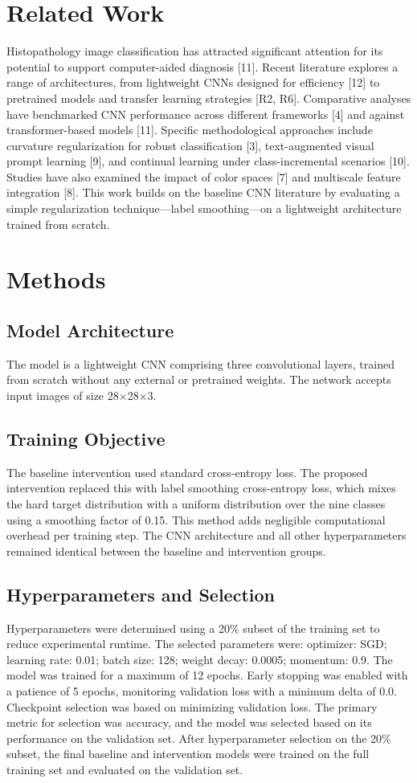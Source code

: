 \documentclass[10pt]{article}
\begin{document}
\section{Related Work}
Histopathology image classification has attracted significant attention for its potential to support computer-aided diagnosis [11]. Recent literature explores a range of architectures, from lightweight CNNs designed for efficiency [12] to pretrained models and transfer learning strategies [R2, R6]. Comparative analyses have benchmarked CNN performance across different frameworks [4] and against transformer-based models [11].
Specific methodological approaches include curvature regularization for robust classification [3], text-augmented visual prompt learning [9], and continual learning under class-incremental scenarios [10]. Studies have also examined the impact of color spaces [7] and multiscale feature integration [8]. This work builds on the baseline CNN literature by evaluating a simple regularization technique—label smoothing—on a lightweight architecture trained from scratch.
\section{Methods}
\subsection{Model Architecture}
The model is a lightweight CNN comprising three convolutional layers, trained from scratch without any external or pretrained weights. The network accepts input images of size 28\ensuremath{\times}28\ensuremath{\times}3.
\subsection{Training Objective}
The baseline intervention used standard cross-entropy loss. The proposed intervention replaced this with label smoothing cross-entropy loss, which mixes the hard target distribution with a uniform distribution over the nine classes using a smoothing factor of 0.15. This method adds negligible computational overhead per training step. The CNN architecture and all other hyperparameters remained identical between the baseline and intervention groups.
\subsection{Hyperparameters and Selection}
Hyperparameters were determined using a 20\% subset of the training set to reduce experimental runtime. The selected parameters were: optimizer: SGD; learning rate: 0.01; batch size: 128; weight decay: 0.0005; momentum: 0.9. The model was trained for a maximum of 12 epochs. Early stopping was enabled with a patience of 5 epochs, monitoring validation loss with a minimum delta of 0.0. Checkpoint selection was based on minimizing validation loss. The primary metric for selection was accuracy, and the model was selected based on its performance on the validation set. After hyperparameter selection on the 20\% subset, the final baseline and intervention models were trained on the full training set and evaluated on the validation set.
\end{document}
